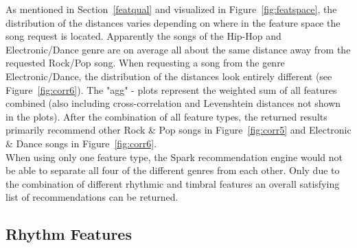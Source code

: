 \noindent As mentioned in Section~\ref{featqual} and visualized in Figure~\ref{fig:featspace}, the distribution of the distances varies depending on where in the feature space the song request is located. Apparently the songs of the Hip-Hop and Electronic/Dance genre are on average all about the same distance away from the requested Rock/Pop song. When requesting a song from the genre Electronic/Dance, the distribution of the distances look entirely different (see Figure~\ref{fig:corr6}).
\noindent The "agg" - plots represent the weighted sum of all features combined (also including cross-correlation and Levenshtein distances not shown in the plots). After the combination of all feature types, the returned results primarily recommend other Rock \& Pop songs in Figure~\ref{fig:corr5} and Electronic \& Dance songs in Figure~\ref{fig:corr6}.\\
When using only one feature type, the Spark recommendation engine would not be able to separate all four of the different genres from each other. Only due to the combination of different rhythmic and timbral features an overall satisfying list of recommendations can be returned.\\

\subsection{Rhythm Features}\label{rhythmrec}

